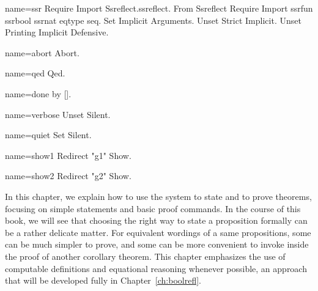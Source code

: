 \begin{coqdef}{name=ssr}
Require Import Ssreflect.ssreflect.
From Ssreflect Require Import ssrfun ssrbool ssrnat eqtype seq.
Set Implicit Arguments.
Unset Strict Implicit.
Unset Printing Implicit Defensive.
\end{coqdef}
\begin{coqdef}{name=abort}
Abort.
\end{coqdef}
\begin{coqdef}{name=qed}
Qed.
\end{coqdef}
\begin{coqdef}{name=done}
by [].
\end{coqdef}
\begin{coqdef}{name=verbose}
Unset Silent.
\end{coqdef}
\begin{coqdef}{name=quiet}
Set Silent.
\end{coqdef}
\begin{coqdef}{name=show1}
Redirect "g1" Show.
\end{coqdef}
\begin{coqdef}{name=show2}
Redirect "g2" Show.
\end{coqdef}

\label{ch:proofs}

In this chapter, we explain how to use the \Coq{} system to state and
to prove theorems, focusing on simple statements and basic proof
commands. In the course of this book, we will see that choosing the
right way to state a proposition formally can be a rather delicate
matter. For equivalent wordings of a same propositions, some can be
much simpler to prove, and some can be more convenient to invoke
inside the proof of another corollary theorem. This chapter emphasizes
the use of computable definitions and equational reasoning
whenever possible, an approach that will be developed fully in
Chapter~\ref{ch:boolrefl}.



